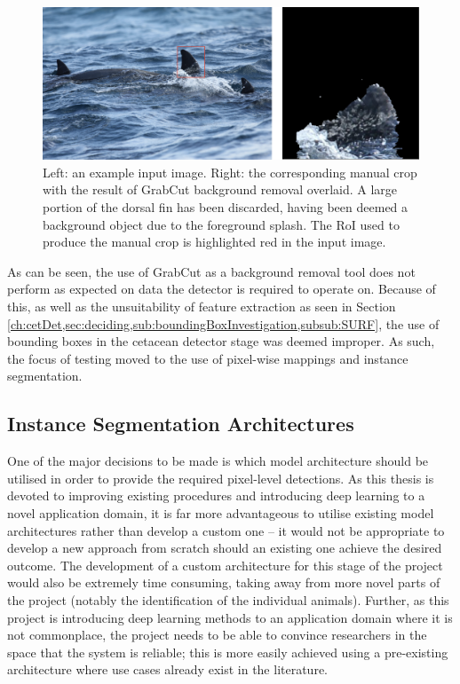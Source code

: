 \begin{figure}
	\begin{center}
		\includegraphics[scale=0.6]{Chapter4/figs/grabcut-example-updated.png}
	\end{center}
	\caption[Left: an example input image. Right: the corresponding manual crop with the result of GrabCut background removal overlaid.]{Left: an example input image. Right: the corresponding manual crop with the result of GrabCut background removal overlaid. A large portion of the dorsal fin has been discarded, having been deemed a background object due to the foreground splash. The RoI used to produce the manual crop is highlighted red in the input image.
	}
	\label{fig:grabcut-example}
\end{figure}

As can be seen, the use of GrabCut as a background removal tool does not perform as expected on data the detector is required to operate on. Because of this, as well as the unsuitability of feature extraction as seen in Section \ref{ch:cetDet,sec:deciding,sub:boundingBoxInvestigation,subsub:SURF}, the use of bounding boxes in the cetacean detector stage was deemed improper. As such, the focus of testing moved to the use of pixel-wise mappings and instance segmentation.  

\subsection{Instance Segmentation Architectures}\label{ch:cetDet,sec:deciding,sub:instanceSegArchitectures}

One of the major decisions to be made is which model architecture should be utilised in order to provide the required pixel-level detections. As this thesis is devoted to improving existing procedures and introducing deep learning to a novel application domain, it is far more advantageous to utilise existing model architectures rather than develop a custom one -- it would not be appropriate to develop a new approach from scratch should an existing one achieve the desired outcome. The development of a custom architecture for this stage of the project would also be extremely time consuming, taking away from more novel parts of the project (notably the identification of the individual animals). Further, as this project is introducing deep learning methods to an application domain where it is not commonplace, the project needs to be able to convince researchers in the space that the system is reliable; this is more easily achieved using a pre-existing architecture where use cases already exist in the literature. 

